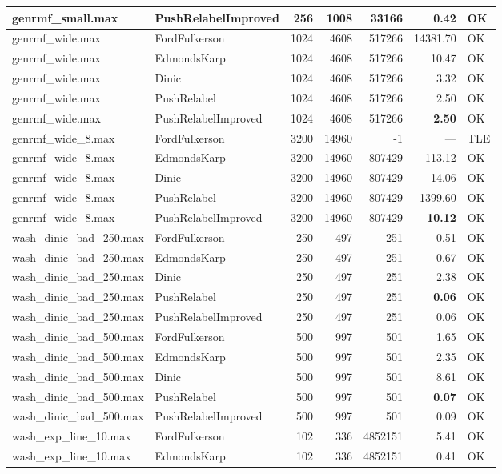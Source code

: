 \begin{longtable}{llrrrrl}
genrmf\_small.max & PushRelabelImproved & 256 & 1008 & 33166 & 0.42 & OK \\
\midrule
genrmf\_wide.max & FordFulkerson & 1024 & 4608 & 517266 & 14381.70 & OK \\
genrmf\_wide.max & EdmondsKarp & 1024 & 4608 & 517266 & 10.47 & OK \\
genrmf\_wide.max & Dinic & 1024 & 4608 & 517266 & 3.32 & OK \\
genrmf\_wide.max & PushRelabel & 1024 & 4608 & 517266 & 2.50 & OK \\
genrmf\_wide.max & PushRelabelImproved & 1024 & 4608 & 517266 & \textbf{2.50} & OK \\
\midrule
genrmf\_wide\_8.max & FordFulkerson & 3200 & 14960 & -1 & --- & TLE \\
genrmf\_wide\_8.max & EdmondsKarp & 3200 & 14960 & 807429 & 113.12 & OK \\
genrmf\_wide\_8.max & Dinic & 3200 & 14960 & 807429 & 14.06 & OK \\
genrmf\_wide\_8.max & PushRelabel & 3200 & 14960 & 807429 & 1399.60 & OK \\
genrmf\_wide\_8.max & PushRelabelImproved & 3200 & 14960 & 807429 & \textbf{10.12} & OK \\
\midrule
wash\_dinic\_bad\_250.max & FordFulkerson & 250 & 497 & 251 & 0.51 & OK \\
wash\_dinic\_bad\_250.max & EdmondsKarp & 250 & 497 & 251 & 0.67 & OK \\
wash\_dinic\_bad\_250.max & Dinic & 250 & 497 & 251 & 2.38 & OK \\
wash\_dinic\_bad\_250.max & PushRelabel & 250 & 497 & 251 & \textbf{0.06} & OK \\
wash\_dinic\_bad\_250.max & PushRelabelImproved & 250 & 497 & 251 & 0.06 & OK \\
\midrule
wash\_dinic\_bad\_500.max & FordFulkerson & 500 & 997 & 501 & 1.65 & OK \\
wash\_dinic\_bad\_500.max & EdmondsKarp & 500 & 997 & 501 & 2.35 & OK \\
wash\_dinic\_bad\_500.max & Dinic & 500 & 997 & 501 & 8.61 & OK \\
wash\_dinic\_bad\_500.max & PushRelabel & 500 & 997 & 501 & \textbf{0.07} & OK \\
wash\_dinic\_bad\_500.max & PushRelabelImproved & 500 & 997 & 501 & 0.09 & OK \\
\midrule
wash\_exp\_line\_10.max & FordFulkerson & 102 & 336 & 4852151 & 5.41 & OK \\
wash\_exp\_line\_10.max & EdmondsKarp & 102 & 336 & 4852151 & 0.41 & OK \\

\end{longtable}
